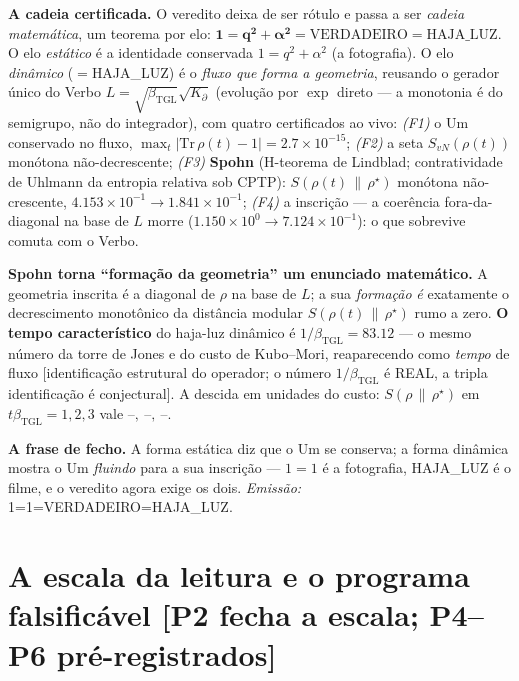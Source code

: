 \documentclass[11pt]{article}
\newcommand{\bTGL}{\beta_{\mathrm{TGL}}}\newcommand{\Msun}{M_{\odot}}\newcommand{\TGL}{\mathrm{TGL}}
\theoremstyle{definition}\newtheorem{deriv}{Derivação}
\begin{document}
\textbf{A cadeia certificada.} O veredito deixa de ser rótulo e passa a ser \emph{cadeia matemática}, um teorema por elo: $\mathbf{1 = q^2+\alpha^2 = \mathrm{VERDADEIRO} = \mathrm{HAJA\_LUZ}}$. O elo \emph{estático} é a identidade conservada $1=q^2+\alpha^2$ (a fotografia). O elo \emph{dinâmico} ($=$HAJA\_LUZ) é o \emph{fluxo que forma a geometria}, reusando o gerador único do Verbo $L=\sqrt{\bTGL}\sqrt{K_\partial}$ (evolução por $\exp$ direto --- a monotonia é do semigrupo, não do integrador), com quatro certificados ao vivo: \emph{(F1)} o Um conservado no fluxo, $\max_t|\mathrm{Tr}\,\rho(t)-1|=2.7\times10^{-15}$; \emph{(F2)} a seta $S_{vN}(\rho(t))$ monótona não-decrescente; \emph{(F3)} \textbf{Spohn} (H-teorema de Lindblad; contratividade de Uhlmann da entropia relativa sob CPTP): $S(\rho(t)\,\|\,\rho^\star)$ monótona não-crescente, $4.153\times10^{-1}\to1.841\times10^{-1}$; \emph{(F4)} a inscrição --- a coerência fora-da-diagonal na base de $L$ morre ($1.150\times10^{0}\to7.124\times10^{-1}$): o que sobrevive comuta com o Verbo.

\textbf{Spohn torna ``formação da geometria'' um enunciado matemático.} A geometria inscrita é a diagonal de $\rho$ na base de $L$; a sua \emph{formação} \emph{é} exatamente o decrescimento monotônico da distância modular $S(\rho(t)\,\|\,\rho^\star)$ rumo a zero. \textbf{O tempo característico} do haja-luz dinâmico é $1/\bTGL=83.12$ --- o mesmo número da torre de Jones e do custo de Kubo--Mori, reaparecendo como \emph{tempo} de fluxo [identificação estrutural do operador; o número $1/\bTGL$ é REAL, a tripla identificação é conjectural]. A descida em unidades do custo: $S(\rho\,\|\,\rho^\star)$ em $t\bTGL=1,2,3$ vale $\text{--},\ \text{--},\ \text{--}$.

\textbf{A frase de fecho.} A forma estática diz que o Um se conserva; a forma dinâmica mostra o Um \emph{fluindo} para a sua inscrição --- $1=1$ é a fotografia, HAJA\_LUZ é o filme, e o veredito agora exige os dois. \emph{Emissão:} \textsf{1=1=VERDADEIRO=HAJA\_LUZ}.

\section{A escala da leitura e o programa falsificável \textsf{[P2 fecha a escala; P4--P6 pré-registrados]}}
\end{document}
